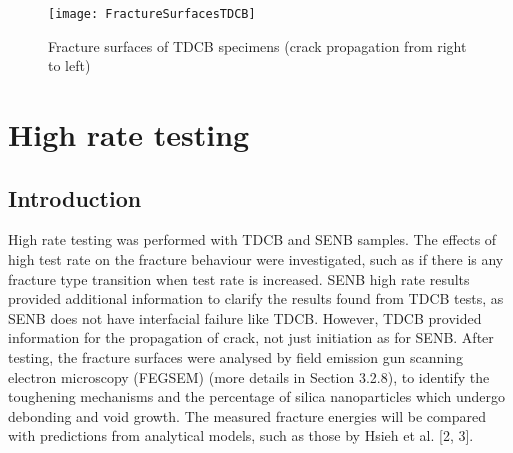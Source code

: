 \documentclass[numbers=noendperiod,chapterprefix=on]{icldt} %
\begin{document}
\begin{figure}[!htpb]
\centering
\texttt{[image: FractureSurfacesTDCB]}
\caption{Fracture surfaces of TDCB specimens (crack propagation from right to left)} %
\end{figure}

\section{High rate testing}
\subsection{Introduction}
High rate testing was performed with TDCB and SENB samples. The effects of high test rate on the fracture behaviour were investigated, such as if there is any fracture type transition when test rate is increased. SENB high rate results provided additional information to clarify the results found from TDCB tests, as SENB does not have interfacial failure like TDCB. However, TDCB provided information for the propagation of crack, not just initiation as for SENB. 
After testing, the fracture surfaces were analysed by field emission gun scanning electron microscopy (FEGSEM) (more details in Section 3.2.8), to identify the toughening mechanisms and the percentage of silica nanoparticles which undergo debonding and void growth. The measured fracture energies will be compared with predictions from analytical models, such as those by Hsieh et al. [2, 3].
\end{document}
